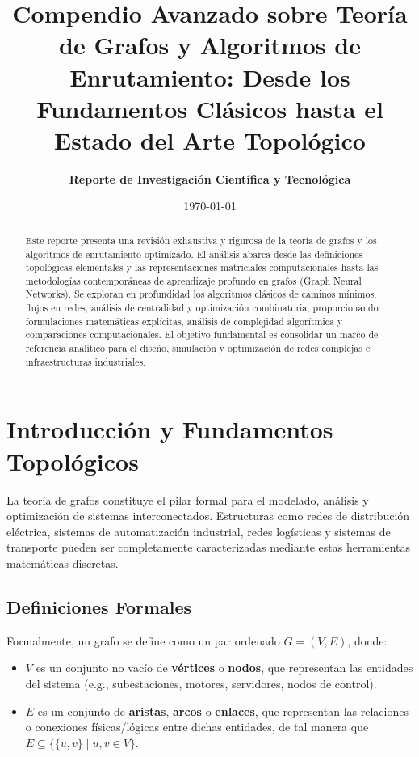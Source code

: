 \documentclass[11pt,letterpaper]{article}
\title{\textbf{Compendio Avanzado sobre Teoría de Grafos y Algoritmos de Enrutamiento: Desde los Fundamentos Clásicos hasta el Estado del Arte Topológico}}
\author{\textbf{Reporte de Investigación Científica y Tecnológica}}
\date{\today}
\begin{document}
\maketitle

\begin{abstract}
Este reporte presenta una revisión exhaustiva y rigurosa de la teoría de grafos y los algoritmos de enrutamiento optimizado. El análisis abarca desde las definiciones topológicas elementales y las representaciones matriciales computacionales hasta las metodologías contemporáneas de aprendizaje profundo en grafos (Graph Neural Networks). Se exploran en profundidad los algoritmos clásicos de caminos mínimos, flujos en redes, análisis de centralidad y optimización combinatoria, proporcionando formulaciones matemáticas explícitas, análisis de complejidad algorítmica y comparaciones computacionales. El objetivo fundamental es consolidar un marco de referencia analítico para el diseño, simulación y optimización de redes complejas e infraestructuras industriales.
\end{abstract}

\newpage
\tableofcontents
\newpage

\section{Introducción y Fundamentos Topológicos}
La teoría de grafos constituye el pilar formal para el modelado, análisis y optimización de sistemas interconectados. Estructuras como redes de distribución eléctrica, sistemas de automatización industrial, redes logísticas y sistemas de transporte pueden ser completamente caracterizadas mediante estas herramientas matemáticas discretas.

\subsection{Definiciones Formales}
Formalmente, un grafo se define como un par ordenado $G = (V, E)$, donde:
\begin{itemize}
    \item $V$ es un conjunto no vacío de \textbf{vértices} o \textbf{nodos}, que representan las entidades del sistema (e.g., subestaciones, motores, servidores, nodos de control).
    \item $E$ es un conjunto de \textbf{aristas}, \textbf{arcos} o \textbf{enlaces}, que representan las relaciones o conexiones físicas/lógicas entre dichas entidades, de tal manera que $E \subseteq \{\{u, v\} \mid u, v \in V\}$.
\end{itemize}
\end{document}
